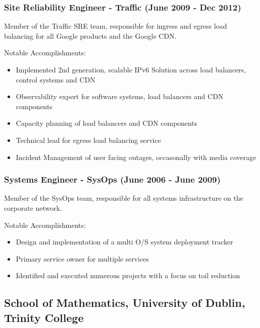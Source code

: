 \documentclass[a4paper, 10pt] {article}
\begin{document}
\subsubsection*{Site Reliability Engineer - Traffic (June 2009 - Dec 2012)}

Member of the Traffic SRE team, responsible for ingress and egress load balancing for all Google products and the Google CDN. 

\vspace{4mm}  %

Notable Accomplishments:

\begin{itemize}[itemsep=2pt,parsep=2pt]
  \item Implemented 2nd generation, scalable IPv6 Solution across load balancers, control systems and CDN
  \item Observability expert for software systems, load balancers and CDN components 
  \item Capacity planning of load balancers and CDN components
  \item Technical lead for egress load balancing service
  \item Incident Management of user facing outages, occasonally with media coverage
\end{itemize}

\subsubsection*{Systems Engineer - SysOps (June 2006 - June 2009)}

Member of the SysOps team, responsible for all systems infrastructure on the corporate network.

\vspace{4mm}  %

Notable Accomplishments:

\begin{itemize}[itemsep=2pt,parsep=2pt]
  \item Design and implementation of a multi O/S system deployment tracker
  \item Primary service owner for multiple services
  \item Identified and executed numerous projects with a focus on toil reduction
\end{itemize}

\subsection*{School of Mathematics, University of Dublin, Trinity College}
\end{document}
